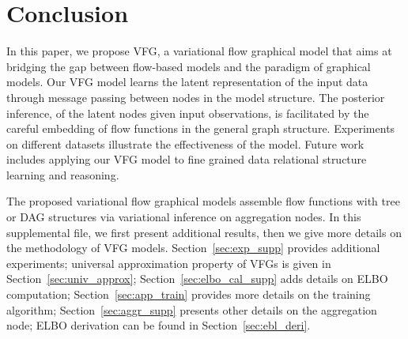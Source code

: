 \documentclass[sigconf, anonymous, review]{acmart}
\theoremstyle{plain}
\theoremstyle{definition}
\theoremstyle{remark}
\begin{document}

\section{Conclusion}\label{sec:conclusion}
In this paper, we propose VFG, a variational flow graphical model that aims at bridging the gap between  flow-based models and the paradigm of graphical models.
Our VFG model learns the latent representation of  the input data through message passing between nodes in the model structure.
The posterior inference, of the latent nodes given input observations, is facilitated by the careful embedding of  flow functions in the general graph structure.
Experiments on different datasets illustrate the effectiveness of the model. 
Future work includes applying our VFG model to fine grained data relational structure learning and reasoning. 










\appendix
\newpage

The proposed variational flow graphical models assemble flow functions with tree or DAG structures via variational inference on aggregation nodes. In this supplemental file, we first present additional results, then we give more details on  the methodology of VFG models. Section~\ref{sec:exp_supp} provides additional experiments; universal approximation property of VFGs is given in  Section~\ref{sec:univ_approx}; Section~\ref{sec:elbo_cal_supp} adds details on ELBO computation; Section~\ref{sec:app_train} provides more details on the training algorithm; Section~\ref{sec:aggr_supp} presents other details on the aggregation node; ELBO derivation  can be found in Section~\ref{sec:ebl_deri}. 
\end{document}
